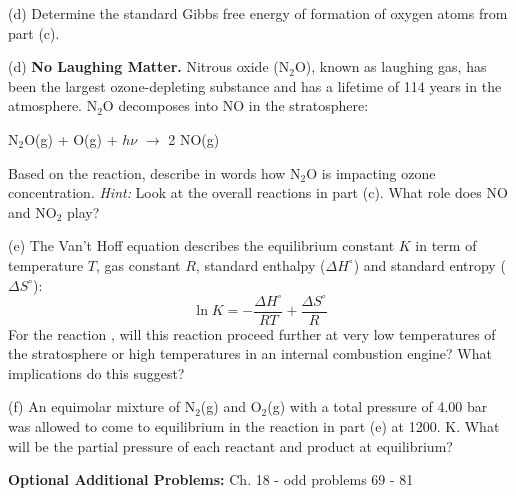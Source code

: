 \documentclass[11pt]{article}
\begin{document}
(d) Determine the standard Gibbs free energy of formation of oxygen atoms from part (c).

(d) \textbf{No Laughing Matter.} Nitrous oxide (N$_2$O), known as laughing gas,
has been the largest ozone-depleting substance and has a lifetime of 114 years in the
atmosphere. N$_2$O decomposes into NO in the stratosphere:
\begin{center}
  N$_2$O(g) + O(g) + $h\nu$ $\rightarrow$ 2 NO(g)
\end{center}
Based on the reaction, describe in words how N$_2$O is impacting ozone concentration.
\textit{Hint:} Look at the overall reactions in part (c). What role does NO and NO$_2$ play?

(e) The Van't Hoff equation describes the equilibrium constant $K$ in term of temperature
$T$, gas constant $R$, standard enthalpy ($\Delta H^\circ$) and standard entropy
($\Delta S^\circ$):
\begin{equation}
  \ln K = -\frac{\Delta H^\circ}{RT} + \frac{\Delta S^\circ}{R}
\end{equation}
For the reaction , will this reaction proceed further
at very low temperatures of the stratosphere or high temperatures in an internal combustion
engine? What implications do this suggest?

(f) An equimolar mixture of N$_2$(g) and O$_2$(g) with a total pressure of 4.00 bar
was allowed to come to equilibrium in the reaction in part (e) at 1200. K. What will
be the partial pressure of each reactant and product at equilibrium?


\vfill
\textbf{Optional Additional Problems:} Ch. 18 - odd problems 69 - 81
\end{document}
